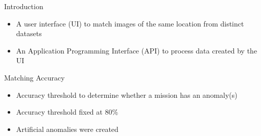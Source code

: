 \begin{frame}{Introduction}
    \begin{itemize}
        \item A user interface (UI) to match images of the same location from distinct datasets
        \item An Application Programming Interface (API) to process data created by the UI
    \end{itemize}
\end{frame}


\begin{frame}{Matching Accuracy}
    \begin{itemize}
        \item Accuracy threshold to determine whether a mission has an anomaly(s)
        \item Accuracy threshold fixed at 80\%
        \item Artificial anomalies were created
    \end{itemize}
\end{frame}

